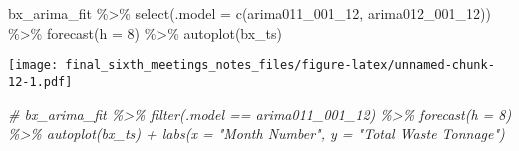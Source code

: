 \documentclass[
]{article}
\newenvironment{Shaded}{\begin{snugshade}}{\end{snugshade}}
\newcommand{\AttributeTok}[1]{\textcolor[rgb]{0.77,0.63,0.00}{#1}}
\newcommand{\CommentTok}[1]{\textcolor[rgb]{0.56,0.35,0.01}{\textit{#1}}}
\newcommand{\DecValTok}[1]{\textcolor[rgb]{0.00,0.00,0.81}{#1}}
\newcommand{\FunctionTok}[1]{\textcolor[rgb]{0.00,0.00,0.00}{#1}}
\newcommand{\NormalTok}[1]{#1}
\newcommand{\SpecialCharTok}[1]{\textcolor[rgb]{0.00,0.00,0.00}{#1}}
\begin{document}
\begin{Shaded}
\begin{Highlighting}[]
\NormalTok{bx\_arima\_fit }\SpecialCharTok{\%\textgreater{}\%} \FunctionTok{select}\NormalTok{(}\AttributeTok{.model =} \FunctionTok{c}\NormalTok{(arima011\_001\_12, arima012\_001\_12)) }\SpecialCharTok{\%\textgreater{}\%} \FunctionTok{forecast}\NormalTok{(}\AttributeTok{h =} \DecValTok{8}\NormalTok{) }\SpecialCharTok{\%\textgreater{}\%} \FunctionTok{autoplot}\NormalTok{(bx\_ts)}
\end{Highlighting}
\end{Shaded}

\texttt{[image: final\_sixth\_meetings\_notes\_files/figure-latex/unnamed-chunk-12-1.pdf]}

\begin{Shaded}
\begin{Highlighting}[]
\CommentTok{\# bx\_arima\_fit \%\textgreater{}\% filter(.model == arima011\_001\_12) \%\textgreater{}\% forecast(h = 8) \%\textgreater{}\% autoplot(bx\_ts) + labs(x = "Month Number", y = "Total Waste Tonnage")}
\end{Highlighting}
\end{Shaded}
\end{document}
